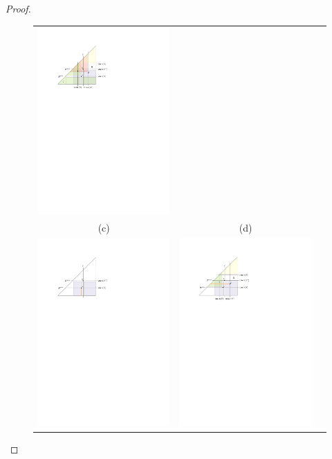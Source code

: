 \documentclass{patmorin}
\begin{document}
\begin{proof}
\begin{figure}
\begin{center}
\begin{tabular}{ccc}
         \includegraphics[width=.47\textwidth]{figs/survivors-proof-4} \\
         (c) & (d) \\[1em]
         \includegraphics[width=.47\textwidth]{figs/survivors-proof-5} &
         \includegraphics[width=.47\textwidth]{figs/survivors-proof-6} \\

\end{tabular}
\end{center}
\end{figure}
\end{proof}
\end{document}
